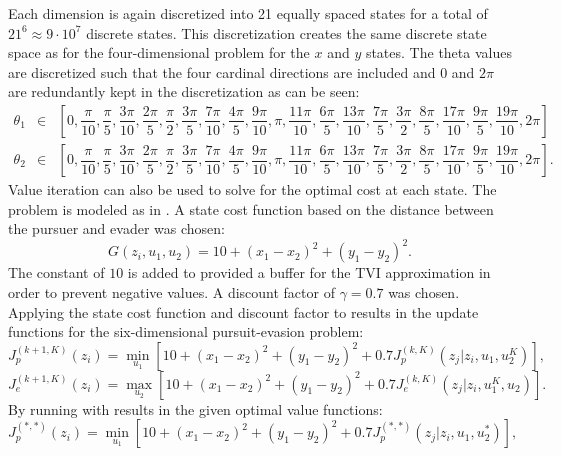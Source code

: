 Each dimension is again discretized into 21 equally spaced states for a total of $21^6 \approx 9\cdot10^7$ discrete states. This discretization creates the same discrete state space as for the four-dimensional problem for the $x$ and $y$ states. The theta values are discretized such that the four cardinal directions are included and $0$ and $2\pi$ are redundantly kept in the discretization as can be seen:
\begin{eqnarray*}
\theta_1 & \in & [0,\dfrac{\pi}{10},\dfrac{\pi}{5},\dfrac{3\pi}{10},\dfrac{2\pi}{5},\dfrac{\pi}{2},\dfrac{3\pi}{5},\dfrac{7\pi}{10},\dfrac{4\pi}{5},\dfrac{9\pi}{10},\pi,\dfrac{11\pi}{10},\dfrac{6\pi}{5},\dfrac{13\pi}{10},\dfrac{7\pi}{5},\dfrac{3\pi}{2},\dfrac{8\pi}{5},\dfrac{17\pi}{10},\dfrac{9\pi}{5},\dfrac{19\pi}{10},2\pi]\\
\theta_2 & \in & [0,\dfrac{\pi}{10},\dfrac{\pi}{5},\dfrac{3\pi}{10},\dfrac{2\pi}{5},\dfrac{\pi}{2},\dfrac{3\pi}{5},\dfrac{7\pi}{10},\dfrac{4\pi}{5},\dfrac{9\pi}{10},\pi,\dfrac{11\pi}{10},\dfrac{6\pi}{5},\dfrac{13\pi}{10},\dfrac{7\pi}{5},\dfrac{3\pi}{2},\dfrac{8\pi}{5},\dfrac{17\pi}{10},\dfrac{9\pi}{5},\dfrac{19\pi}{10},2\pi].
\end{eqnarray*} 
Value iteration can also be used to solve for the optimal cost at each state. The problem is modeled as in . A state cost function based on the distance between the pursuer and evader was chosen: 
\begin{equation}\label{6cost}
G(z_i,u_1,u_2)= 10+(x_1-x_2)^2+(y_1-y_2)^2.
\end{equation}
The constant of $10$ is added to provided a buffer for the TVI approximation in order to prevent negative values. A discount factor of $\gamma = 0.7$ was chosen. Applying the state cost function and discount factor to  results in the update functions for the six-dimensional pursuit-evasion problem:
\begin{equation}\label{6pbell}
J_p^{(k+1,K)}(z_i)= \underset{u_1 }{\operatorname{min }}[10+(x_1-x_2)^2+(y_1-y_2)^2+0.7 J_p^{(k,K)}(z_j|z_i,u_1,u_2^K)],
\end{equation}
\begin{equation}\label{6ebell}
J_e^{(k+1,K)}(z_i)= \underset{u_2 }{\operatorname{max }}[10+(x_1-x_2)^2+(y_1-y_2)^2+0.7 J_e^{(k,K)}(z_j|z_i,u_1^K,u_2)].
\end{equation} 
By running  with  results in the given optimal value functions:
\begin{equation}\label{6pbropt}
J_p^{(*,*)}(z_i)= \underset{u_1 }{\operatorname{min }}[10+(x_1-x_2)^2+(y_1-y_2)^2+0.7 J_p^{(*,*)}(z_j|z_i,u_1,u_2^*)],
\end{equation}
